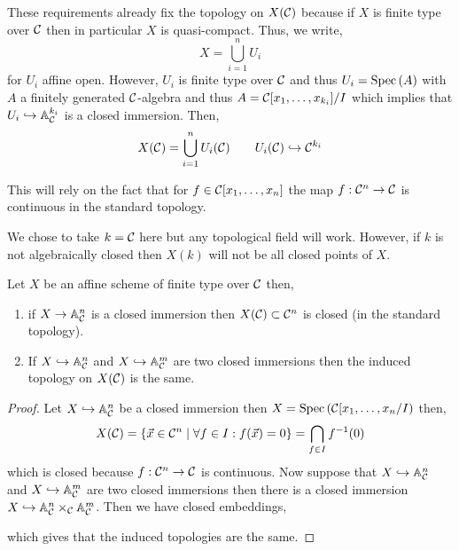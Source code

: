 \documentclass[12pt]{article}
\begin{document}
\begin{remark}
These requirements already fix the topology on $X(\mathcal{C})$ because if $X$ is finite type over $\mathcal{C}$ then in particular $X$ is quasi-compact. Thus, we write,
\[ X = \bigcup_{i = 1}^n U_i \]
for $U_i$ affine open. However, $U_i$ is finite type over $\mathcal{C}$ and thus $U_i = \mathrm{Spec}\left( A \right)$ with $A$ a finitely generated $\mathcal{C}$-algebra and thus $A = \mathcal{C}[x_1, \dots, x_{k_i}] / I$ which implies that $U_i \hookrightarrow \mathbb{A}_{\mathcal{C}}^{k_i}$ is a closed immersion. Then,
\[ X(\mathcal{C}) = \bigcup_{i = 1}^n U_i(\mathcal{C}) \quad \quad U_i(\mathcal{C}) \hookrightarrow \mathcal{C}^{k_i} \]
\end{remark}

\begin{remark}
This will rely on the fact that for $f \in \mathcal{C}[x_1, \dots, x_n]$ the map $f : \mathcal{C}^n \to \mathcal{C}$ is continuous in the standard topology.   
\end{remark}

\begin{remark}
We chose to take $k = \mathcal{C}$ here but any topological field will work. However, if $k$ is not algebraically closed then $X(k)$ will not be all closed points of $X$.
\end{remark}

\begin{lemma}
Let $X$ be an affine scheme of finite type over $\mathcal{C}$ then,
\begin{enumerate}
\item if $X \to \mathbb{A}^n_{\mathcal{C}}$ is a closed immersion then $X(\mathcal{C}) \subset \mathcal{C}^n$ is closed (in the standard topology).
\item If $X \hookrightarrow \mathbb{A}^n_{\mathcal{C}}$ and $X \hookrightarrow \mathbb{A}^m_{\mathcal{C}}$ are two closed immersions then the induced topology on $X(\mathcal{C})$ is the same. 
\end{enumerate}
\end{lemma}

\begin{proof}
Let $X \hookrightarrow \mathbb{A}^n_{\mathcal{C}}$ be a closed immersion then $X = \mathrm{Spec}\left( \mathcal{C}[x_1, \dots, x_n / I \right)$ then,
\[ X(\mathcal{C}) = \{ \vec{x} \in \mathcal{C}^n \mid \forall f \in I : f(\vec{x}) = 0 \} = \bigcap_{f \in I} f^{-1}(0) \]
which is closed because $f : \mathcal{C}^n \to \mathcal{C}$ is continuous. Now suppose that $X \hookrightarrow \mathbb{A}^n_{\mathcal{C}}$ and $X \hookrightarrow \mathbb{A}^m_{\mathcal{C}}$ are two closed immersions then there is a closed immersion $X \hookrightarrow \mathbb{A}_{\mathcal{C}}^n \times_{\mathcal{C}} \mathbb{A}_{\mathcal{C}}^m$. Then we have closed embeddings,
\begin{center}
\end{center}
which gives that the induced topologies are the same. 
\end{proof}
\end{document}
